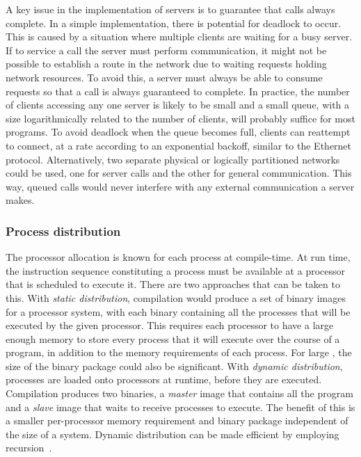 \documentclass[11pt, conference, compsocconf, onecolumn]{IEEEtran}
\newcounter{process}
\begin{document}
A key issue in the implementation of servers is to guarantee that calls always
complete. In a simple implementation, there is potential for deadlock to occur.
This is caused by a situation where multiple clients are waiting for a busy
server. If to service a call the server must perform communication, it might
not be possible to establish a route in the network due to waiting requests
holding network resources.
To avoid this, a server must always be able to consume requests so that a call
is always guaranteed to complete. In practice, the number of clients accessing
any one server is likely to be small and a small queue, with a size
logarithmically related to the number of clients, will probably suffice for most
programs. To avoid deadlock when the queue becomes full, clients can reattempt
to connect, at a rate according to an exponential backoff, similar to the
Ethernet protocol.
Alternatively, two separate physical or logically partitioned networks could be
used, one for server calls and the other for general communication. This way,
queued calls would never interfere with any external communication a server
makes.


\subsubsection{Process distribution}

The processor allocation is known for each process at compile-time. At run
time, the instruction sequence constituting a process must be available at a
processor that is scheduled to execute it. There are two approaches that can be
taken to this.
With \emph{static distribution}, compilation would produce a set of  binary
images for a  processor system, with each binary containing all the
processes that will be executed by the given processor. This requires each
processor to have a large enough memory to store every process that it will
execute over the course of a program, in addition to the memory requirements of
each process. For large , the size of the binary package could also be
significant.
With \emph{dynamic distribution}, processes are loaded onto processors at
runtime, before they are executed. Compilation produces two binaries, a
\emph{master} image that contains all the program and a \emph{slave} image that
waits to receive processes to execute. The benefit of this is a smaller
per-processor memory requirement and binary package independent of the size of
a system. Dynamic distribution can be made efficient by employing
recursion~\cite{Hanlon11}.
\end{document}
